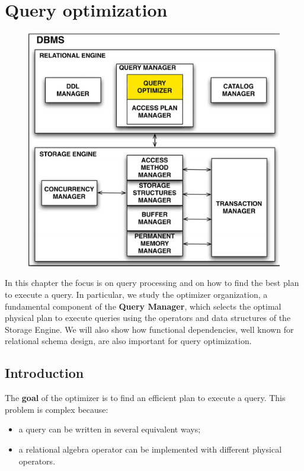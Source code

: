 \section{Query optimization}

\begin{figure}[h!]
		\centering
		\includegraphics[scale = 0.7]{img/queop1.jpg}
		\label{relop13}
\end{figure}

In this chapter the focus is on query processing and on how to find the best plan to execute a query. In particular, we study the optimizer organization, a fundamental component of the \textbf{Query Manager}, which selects the optimal physical plan to execute queries using the operators and data structures of the Storage Engine. We will also show how functional dependencies, well known for relational schema design, are also important for query optimization.

\subsection{Introduction}
The \textbf{goal} of the optimizer is to find an efficient plan to execute a query. This problem is complex because:

\begin{itemize}
    \item a query can be written in several equivalent ways;
    \item a relational algebra operator can be implemented with different physical operators.
\end{itemize}

